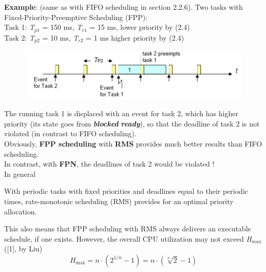 \textbf{Example}: (same as with FIFO scheduling in section 2.2.6). Two tasks with Fixed-Priority-Preemptive Scheduling (FPP):\\

Task 1: \textit{T}${}_{p1}$ = 150 ms, \textit{T}${}_{e1}$ = 15 ms,   lower priority by   (2.4)\\
Task 2: \textit{T}${}_{p2}$ = 10 ms,  \textit{T}${}_{e2}$ = 1 ms   higher priority by (2.4)\\

 	\begin{figure}[h]
    \centering
    \includegraphics[width=12cm, height=2.5cm]{Images/image99.png}
    \label{fig:Fig }
    \end{figure}

The running task 1 is displaced with an event for task 2, which has higher priority (its state goes from \textbf{\textit{blocked}}  \textbf{\textit{ready}}), so that the deadline of task 2 is not violated (in contrast to FIFO scheduling).\\

Obviously,\textbf{ FPP scheduling} with \textbf{RMS} provides much better results than FIFO scheduling. \\

In contrast, with \textbf{FPN}, the deadlines of task 2 would be violated !\\

In general

\begin{tcolorbox}[colback=blue!5!white,colframe=blue!75!black]
 	With periodic tasks with fixed priorities and deadlines equal to their periodic times, rate-monotonic scheduling (RMS) provides for an optimal priority allocation.
\end{tcolorbox}

This also means that FPP scheduling with RMS always delivers an executable schedule, if one exists. However, the overall CPU utilization may not exceed \textit{H${}_{max}$ }([1], by Liu)\\

\begin{equation}
	H_{\max } =n\cdot \left(2^{1/n} -1\right)=n\cdot \left(\sqrt[{n}]{2} -1\right) 
\label{EQ }
\end{equation}


